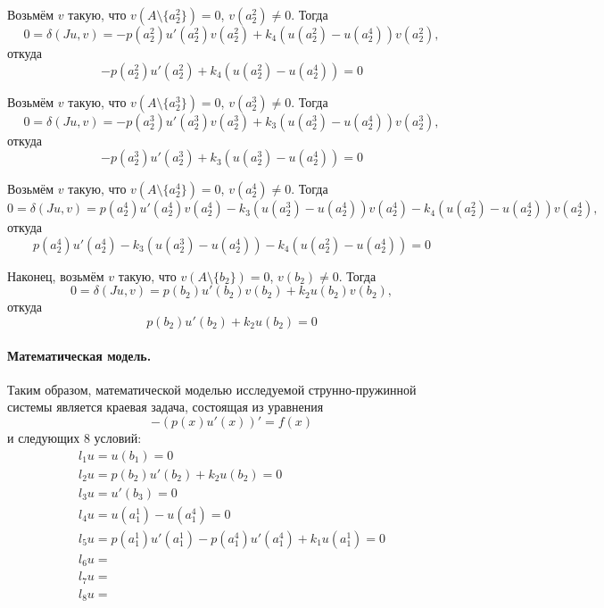 \documentclass[a4paper,12pt]{article} %
\begin{document}
Возьмём $v$ такую, что $v(A \setminus \{a_2^2\}) = 0$, $v(a_2^2) \neq 0$.
Тогда
\begin{equation*}
	0 = \delta(Ju, v) =
	- p(a_2^2) u'(a_2^2) v(a_2^2)
	+ k_4 (u(a_2^2) - u(a_2^4)) v(a_2^2)
	,
\end{equation*}
откуда
\begin{equation}
	- p(a_2^2) u'(a_2^2) + k_4 (u(a_2^2) - u(a_2^4)) = 0
\end{equation}


Возьмём $v$ такую, что $v(A \setminus \{a_2^3\}) = 0$, $v(a_2^3) \neq 0$.
Тогда
\begin{equation*}
	0 = \delta(Ju, v) =
	                              - p(a_2^3) u'(a_2^3) v(a_2^3)
	+ k_3 (u(a_2^3) - u(a_2^4)) v(a_2^3)
	,
\end{equation*}
откуда
\begin{equation}
	- p(a_2^3) u'(a_2^3) + k_3 (u(a_2^3) - u(a_2^4)) = 0
\end{equation}



Возьмём $v$ такую, что $v(A \setminus \{a_2^4\}) = 0$, $v(a_2^4) \neq 0$.
Тогда
\begin{equation*}
	0 = \delta(Ju, v) =
	  p(a_2^4) u'(a_2^4) v(a_2^4)
	- k_3 (u(a_2^3) - u(a_2^4))  v(a_2^4)
	- k_4 (u(a_2^2) - u(a_2^4))  v(a_2^4)
	,
\end{equation*}
откуда
\begin{equation}
	p(a_2^4) u'(a_2^4) - k_3 (u(a_2^3) - u(a_2^4)) - k_4 (u(a_2^2) - u(a_2^4)) = 0
\end{equation}


Наконец, возьмём $v$ такую, что $v(A \setminus \{b_2\}) = 0$, $v(b_2) \neq 0$.
Тогда
\begin{equation*}
	0 = \delta(Ju, v) =
	  p(b_2  ) u'(b_2  ) v(b_2  )
	+ k_2  u(b_2  ) v(b_2  )
	,
\end{equation*}
откуда
\begin{equation}
	p(b_2  ) u'(b_2  ) + k_2  u(b_2  ) = 0
\end{equation}

\paragraph{Математическая модель.}
Таким образом, математической моделью исследуемой струнно-пружинной системы является
краевая задача, состоящая из уравнения
\begin{equation}
	-(p(x)u'(x))' = f(x)
\end{equation}
и следующих 8 условий:
\begin{gather}
	l_1 u = u(b_1) = 0
	\\
	l_2 u = p(b_2  ) u'(b_2  ) + k_2  u(b_2  ) = 0
	\\
	l_3 u = u'(b_3) = 0
	\\
	l_4 u = u(a_1^1) - u(a_1^4) = 0
	\\
	l_5 u = p(a_1^1) u'(a_1^1) - p(a_1^4) u'(a_1^4) + k_1  u(a_1^1) = 0
	\\
	l_6 u =
	\\
	l_7 u =
	\\
	l_8 u =
\end{gather}
\end{document}
